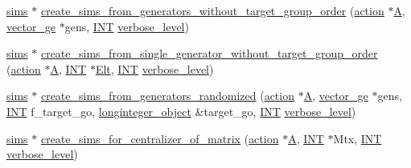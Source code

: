 \begin{DoxyCompactItemize}
\item 
\mbox{\hyperlink{classsims}{sims}} $\ast$ \mbox{\hyperlink{sims__global_8_c_af359c353cea00073083650b1ff856598}{create\+\_\+sims\+\_\+from\+\_\+generators\+\_\+without\+\_\+target\+\_\+group\+\_\+order}} (\mbox{\hyperlink{classaction}{action}} $\ast$\mbox{\hyperlink{simeon_8_c_a97833f04c3a9c008df5521a2fc291bb4}{A}}, \mbox{\hyperlink{classvector__ge}{vector\+\_\+ge}} $\ast$gens, \mbox{\hyperlink{galois_8h_a09fddde158a3a20bd2dcadb609de11dc}{I\+NT}} \mbox{\hyperlink{simeon_8_c_a818073fbcc2f439e7c56952f67386122}{verbose\+\_\+level}})
\item 
\mbox{\hyperlink{classsims}{sims}} $\ast$ \mbox{\hyperlink{sims__global_8_c_a2f7faebe9dedd4ac121609786af7df02}{create\+\_\+sims\+\_\+from\+\_\+single\+\_\+generator\+\_\+without\+\_\+target\+\_\+group\+\_\+order}} (\mbox{\hyperlink{classaction}{action}} $\ast$\mbox{\hyperlink{simeon_8_c_a97833f04c3a9c008df5521a2fc291bb4}{A}}, \mbox{\hyperlink{galois_8h_a09fddde158a3a20bd2dcadb609de11dc}{I\+NT}} $\ast$\mbox{\hyperlink{simeon_8_c_aec1406935bdb1fee3561fcb840964100}{Elt}}, \mbox{\hyperlink{galois_8h_a09fddde158a3a20bd2dcadb609de11dc}{I\+NT}} \mbox{\hyperlink{simeon_8_c_a818073fbcc2f439e7c56952f67386122}{verbose\+\_\+level}})
\item 
\mbox{\hyperlink{classsims}{sims}} $\ast$ \mbox{\hyperlink{sims__global_8_c_a7cd5415a9a6008da180e405ec41a351f}{create\+\_\+sims\+\_\+from\+\_\+generators\+\_\+randomized}} (\mbox{\hyperlink{classaction}{action}} $\ast$\mbox{\hyperlink{simeon_8_c_a97833f04c3a9c008df5521a2fc291bb4}{A}}, \mbox{\hyperlink{classvector__ge}{vector\+\_\+ge}} $\ast$gens, \mbox{\hyperlink{galois_8h_a09fddde158a3a20bd2dcadb609de11dc}{I\+NT}} f\+\_\+target\+\_\+go, \mbox{\hyperlink{classlonginteger__object}{longinteger\+\_\+object}} \&target\+\_\+go, \mbox{\hyperlink{galois_8h_a09fddde158a3a20bd2dcadb609de11dc}{I\+NT}} \mbox{\hyperlink{simeon_8_c_a818073fbcc2f439e7c56952f67386122}{verbose\+\_\+level}})
\item 
\mbox{\hyperlink{classsims}{sims}} $\ast$ \mbox{\hyperlink{sims__global_8_c_a006a14df436fe3af018855660134d585}{create\+\_\+sims\+\_\+for\+\_\+centralizer\+\_\+of\+\_\+matrix}} (\mbox{\hyperlink{classaction}{action}} $\ast$\mbox{\hyperlink{simeon_8_c_a97833f04c3a9c008df5521a2fc291bb4}{A}}, \mbox{\hyperlink{galois_8h_a09fddde158a3a20bd2dcadb609de11dc}{I\+NT}} $\ast$Mtx, \mbox{\hyperlink{galois_8h_a09fddde158a3a20bd2dcadb609de11dc}{I\+NT}} \mbox{\hyperlink{simeon_8_c_a818073fbcc2f439e7c56952f67386122}{verbose\+\_\+level}})
\end{DoxyCompactItemize}



